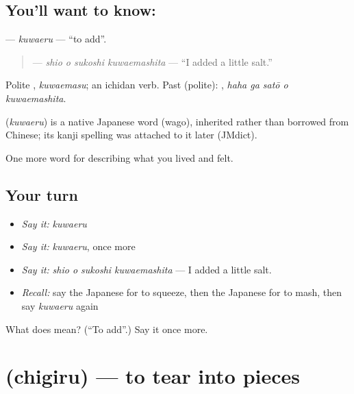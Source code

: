 \subsection*{You'll want to know: }
\textbf{} — \emph{kuwaeru} — \textquotedblleft{}to add\textquotedblright{}.

\begin{quote}
\textbf{  } — \emph{shio o sukoshi kuwaemashita} — \textquotedblleft{}I added a little salt.\textquotedblright{}
\end{quote}

Polite \textbf{}, \emph{kuwaemasu}; an ichidan verb. Past (polite): \textbf{  }, \emph{haha ga satō o kuwaemashita}.

\begin{cousinweb}
\textbf{} (\emph{kuwaeru}) is a native Japanese word (wago), inherited rather than borrowed from Chinese; its kanji spelling was attached to it later (JMdict).
\end{cousinweb}

\begin{grammarlens}[title={What you've built}]
One more word for describing what you lived and felt.
\end{grammarlens}

\subsection*{Your turn}
\begin{itemize}
\raggedright
  \item \emph{Say it:} \emph{kuwaeru}
  \item \emph{Say it:} \emph{kuwaeru}, once more
  \item \emph{Say it:} \emph{shio o sukoshi kuwaemashita} — I added a little salt.
  \item \emph{Recall:} say the Japanese for to squeeze, then the Japanese for to mash, then say \emph{kuwaeru} again
\end{itemize}

\begin{tcolorbox}[breakable,colback=teal!4,colframe=teal!35!black,title={Before you move on}]
What does  mean? (\textquotedblleft{}To add\textquotedblright{}.) Say it once more.
\end{tcolorbox}
\section[\texorpdfstring{\ja{ちぎる} (chigiru)}{ちぎる (chigiru)}]{ (chigiru) — to tear into pieces}

